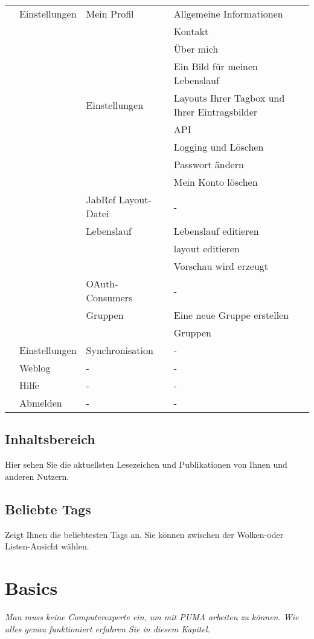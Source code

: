 \documentclass[b5paper,11pt,twoside]{scrbook} %
\begin{document}
\begin{longtable}{|c|m{3cm}|m{3cm}|m{3cm}|}
&Einstellungen&Mein Profil&Allgemeine Informationen\\ \cline{4-4}
&&&Kontakt\\ \cline{4-4}
&&&Über mich\\ \cline{4-4}
&&&Ein Bild für meinen Lebenslauf\\\cline{3-4}
&&Einstellungen&Layouts Ihrer Tagbox und Ihrer Eintragsbilder\\\cline{4-4}
&&&API\\\cline{4-4}
&&&Logging und Löschen\\\cline{4-4}
&&&Passwort ändern\\\cline{4-4}
&&&Mein Konto löschen\\\cline{3-4}
&&JabRef Layout-Datei&-\\\cline{3-4}
&&Lebenslauf& Lebenslauf editieren\\\cline{4-4}
&&&layout editieren\\ \cline{4-4}
&&&Vorschau wird erzeugt\\\cline{3-4}
&&OAuth-Consumers&- \\\cline{3-4}
&&Gruppen&Eine neue Gruppe erstellen\\\cline{4-4}
&&&Gruppen\\\cline{2-4}
&Einstellungen&Synchronisation&-\\\cline{2-4}
&Weblog&-&-\\\cline{2-4}
&Hilfe&-&-\\\cline{2-4}
&Abmelden&-&-\\\hline
\end{longtable}
\normalsize

\subsection{Inhaltsbereich}
Hier sehen Sie die aktuellsten Lesezeichen und Publikationen von Ihnen und anderen Nutzern. 
\subsection{Beliebte Tags}
Zeigt Ihnen die beliebtesten Tags an. Sie können zwischen der Wolken-oder Listen-Ansicht wählen.
\newpage
\section{Basics}
\textit{Man muss keine Computerexperte ein, um mit PUMA arbeiten zu können. Wie alles genau funktioniert erfahren Sie in diesem Kapitel.}
\end{document}
